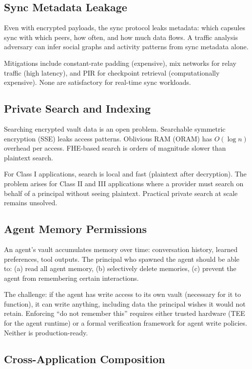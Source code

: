 \subsection{Sync Metadata Leakage}

Even with encrypted payloads, the sync protocol leaks metadata: which capsules
sync with which peers, how often, and how much data flows. A traffic analysis
adversary can infer social graphs and activity patterns from sync metadata
alone.

Mitigations include constant-rate padding (expensive), mix networks for relay
traffic (high latency), and PIR for checkpoint retrieval (computationally
expensive). None are satisfactory for real-time sync workloads.

\subsection{Private Search and Indexing}

Searching encrypted vault data is an open problem. Searchable symmetric
encryption (SSE) leaks access patterns. Oblivious RAM (ORAM) has
$O(\log n)$ overhead per access. FHE-based search is orders of magnitude
slower than plaintext search.

For Class I applications, search is local and fast (plaintext after
decryption). The problem arises for Class II and III applications where a
provider must search on behalf of a principal without seeing plaintext.
Practical private search at scale remains unsolved.

\subsection{Agent Memory Permissions}

An agent's vault accumulates memory over time: conversation history, learned
preferences, tool outputs. The principal who spawned the agent should be able
to: (a) read all agent memory, (b) selectively delete memories, (c) prevent
the agent from remembering certain interactions.

The challenge: if the agent has write access to its own vault (necessary for
it to function), it can write anything, including data the principal wishes
it would not retain. Enforcing ``do not remember this'' requires either
trusted hardware (TEE for the agent runtime) or a formal verification
framework for agent write policies. Neither is production-ready.

\subsection{Cross-Application Composition}

